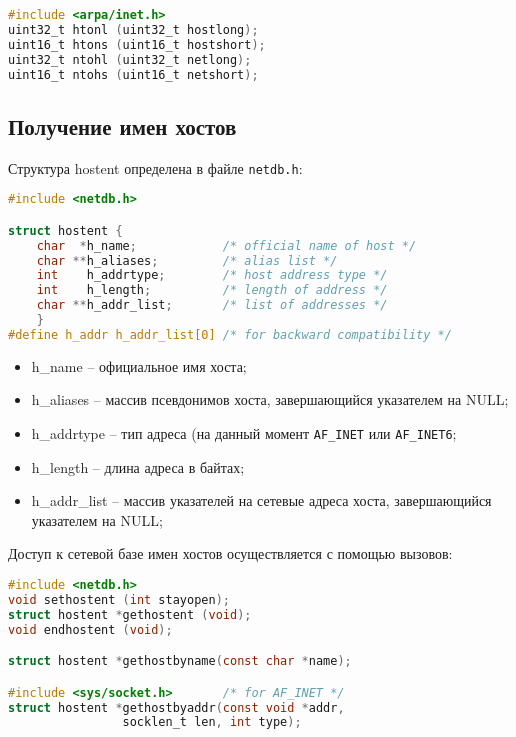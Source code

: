 \begin{lstlisting}[language=C, caption="Описание функций преобразования целочисленных значений из хостового порядка байт в сетевой и наоборот."]
#include <arpa/inet.h>
uint32_t htonl (uint32_t hostlong);
uint16_t htons (uint16_t hostshort);
uint32_t ntohl (uint32_t netlong);
uint16_t ntohs (uint16_t netshort);
\end{lstlisting}

\subsection{Получение имен хостов}

Структура hostent определена в файле {\tt netdb.h}:
\begin{lstlisting}[language=C]
#include <netdb.h>

struct hostent {
	char  *h_name;            /* official name of host */
	char **h_aliases;         /* alias list */
	int    h_addrtype;        /* host address type */
	int    h_length;          /* length of address */
	char **h_addr_list;       /* list of addresses */
	}
#define h_addr h_addr_list[0] /* for backward compatibility */
\end{lstlisting}

\begin{itemize}
\item h\_name -- официальное имя хоста;
\item h\_aliases -- массив псевдонимов хоста, завершающийся указателем на NULL;
\item h\_addrtype -- тип адреса (на данный момент {\tt AF\_INET} или {\tt AF\_INET6};
\item h\_length -- длина адреса в байтах;
\item h\_addr\_list -- массив указателей на сетевые адреса хоста, завершающийся указателем на NULL;
\end{itemize}

Доступ к сетевой базе имен хостов осуществляется с помощью вызовов:
\begin{lstlisting}[language=C]
#include <netdb.h>
void sethostent (int stayopen);
struct hostent *gethostent (void);
void endhostent (void);

struct hostent *gethostbyname(const char *name);

#include <sys/socket.h>       /* for AF_INET */
struct hostent *gethostbyaddr(const void *addr,
				socklen_t len, int type);
\end{lstlisting}

